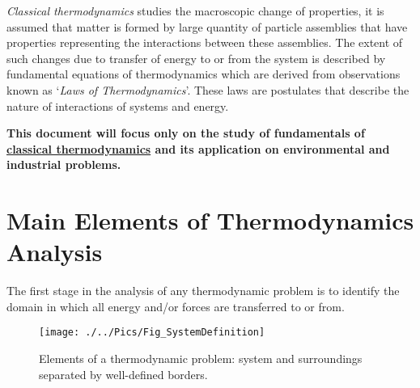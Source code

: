    {\it Classical thermodynamics} studies the macroscopic change of properties, \ie it is assumed that matter is formed by large quantity of particle assemblies that have properties representing the interactions between these assemblies. The extent of such changes due to transfer of energy to or from the system is described by fundamental equations of thermodynamics which are derived from observations known as `{\it Laws of Thermodynamics}'. These laws are postulates that describe the nature of interactions of systems and energy.

   {\bf This document will focus only on the study of fundamentals of \underline{classical thermodynamics} and its application on environmental and industrial problems. }

   \section{Main Elements of Thermodynamics Analysis}\label{Chapter:Introduction:Section:ThermodAnalysis}

   The first stage in the analysis of any thermodynamic problem is to identify the domain in which all energy and/or forces are transferred to or from.
   \begin{figure}[h]
     \begin{center}
       \texttt{[image: ./../Pics/Fig\_SystemDefinition]}
       \caption{Elements of a thermodynamic problem: system and surroundings separated by well-defined borders.}\label{Chapter:Introduction:Fig:Domain}
     \end{center}
   \end{figure}
   
   
